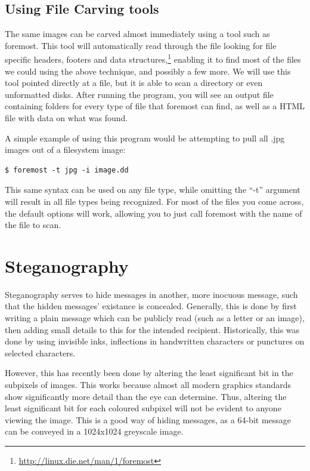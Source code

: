 		\subsection{Using File Carving tools}
			The same images can be carved almost immediately using a tool such as foremost. 
			This tool will automatically read through the file looking for file specific headers, footers and data structures,\footnote{\url{http://linux.die.net/man/1/foremost}}
			enabling it to find most of the files we could using the above technique, and possibly a few more. 
			We will use this tool pointed directly at a file, but it is able to scan a directory or even unformatted disks. 
			After running the program, you will see an output file containing folders for every type of file that foremost can find, as well as a HTML file with data on what was found. 

			A simple example of using this program would be attempting to pull all .jpg images out of a filesystem image:
			\begin{lstlisting}[style=CLI]
				$ foremost -t jpg -i image.dd
			\end{lstlisting}
			This same syntax can be used on any file type, while omitting the ``-t'' argument will result in all file types being recognized. 
			For most of the files you come across, the default options will work, allowing you to just call foremost with the name of the file to scan. 


	\section{Steganography}
		Steganography serves to hide messages in another, more inocuous message, such that the hidden messages' existance is concealed. 
		Generally, this is done by first writing a plain message which can be publicly read (such as a letter or an image), 
		then adding small details to this for the intended recipient. 
		Historically, this was done by using invisible inks, inflections in handwritten characters or punctures on selected characters. 

		However, this has recently been done by altering the least significant bit in the subpixels of images. 
		This works because almost all modern graphics standards show significantly more detail than the eye can determine.
		Thus, altering the least significant bit for each coloured subpixel will not be evident to anyone viewing the image. 
		This is a good way of hiding messages, as a 64-bit message can be conveyed in a 1024x1024 greyscale image. 

